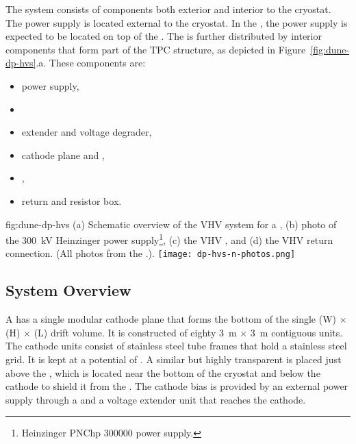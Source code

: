 The  system consists of components both exterior and interior to the cryostat. The  power supply is located external to the cryostat.  In the , the  power supply is expected to be located on top of the  \fdth. The  is further distributed by interior components that form part of the TPC structure, as depicted in Figure~\ref{fig:dune-dp-hvs}.a.  These components are:

\begin{itemize}
\item power supply,
\item {} \fdth
\item {} extender and voltage degrader,
\item cathode plane and , 
\item {},
\item {} return \fdth and resistor box.
\end{itemize}


\begin{dunefigure}
{fig:dune-dp-hvs}
{(a) Schematic overview of the VHV system for a \dpmod{}, 
(b) photo of the \SI{300}{\kV} Heinzinger power supply\footnote{Heinzinger\texttrademark{} PNChp 300000 power supply.}, (c) the VHV \fdth{}, and (d) the VHV return connection. (All photos from the .).}
\texttt{[image: dp-hvs-n-photos.png]}
\end{dunefigure}

\subsection{System Overview}

A \dpmod  has a single modular cathode plane that forms the bottom of the single
  \dptpcwdth (W) $\times$ \tpcheight (H) $\times$ \dptpclen (L) drift volume. It is constructed of eighty \SI{3}{\m} $\times$ \SI{3}{\m} contiguous units. 
The cathode units consist of stainless steel tube frames that hold a stainless steel grid. It is kept at a potential of \dptargetdriftvoltneg.  A similar but highly transparent  is placed just above the  , which is located near the bottom of the cryostat and below the cathode to shield it from the .
The cathode bias is provided by an external  power supply through a  \fdth and a voltage extender unit that reaches the cathode.
 
